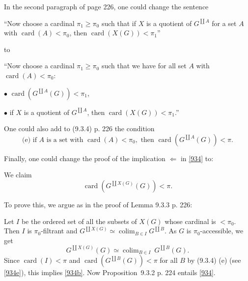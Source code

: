 \documentclass[12pt]{article}
\theoremstyle{remark}
\newcommand{\bu}{\bullet}
\newcommand{\n}{\noindent}
\newcommand{\be}{\begin{equation}}
\newcommand{\ee}{\end{equation}}
\DeclareMathOperator*{\co}{colim}
\DeclareMathOperator{\ca}{card}
\begin{document}
In the second paragraph of page 226, one could change the sentence 

``Now choose a cardinal $\pi_1\ge\pi_0$ such that if $X$ is a quotient of $G^{\coprod A}$ for a set $A$ with $\ca(A)<\pi_0$, then $\ca(X(G))<\pi_1$''

\n to 

``Now choose a cardinal $\pi_1\ge\pi_0$ such that we have for all set $A$ with $\ca(A)<\pi_0$: 

$\bu$ $\ca(G^{\coprod A}(G))<\pi_1$, 

$\bu$ if $X$ is a quotient of $G^{\coprod A}$, then $\ca(X(G))<\pi_1$.'' 

One could also add to (9.3.4) p. 226 the condition 
\be\label{934e}
\text{(e) if }A\text{ is a set with }\ca(A)<\pi_0,\text{ then }\ca(G^{\coprod A}(G))<\pi.
\ee

Finally, one could change the proof of the implication $\Leftarrow$ in \eqref{934} to: 

We claim  
\be\label{934b}
\ca(G^{\coprod X(G)}(G))<\pi.
\ee 

To prove this, we argue as in the proof of Lemma 9.3.3 p. 226: 

Let $I$ be the ordered set of all the subsets of $X(G)$ whose cardinal is $<\pi_0$. Then $I$ is $\pi_0$-filtrant and $G^{\coprod X(G)}\simeq\co_{B\in I}G^{\coprod B}$. As $G$ is $\pi_0$-accessible, we get 
$$
G^{\coprod X(G)}(G)\simeq\co_{B\in I}\ G^{\coprod B}(G).
$$ 
Since $\ca(I)<\pi$ and $\ca(G^{\coprod B}(G))<\pi$ for all $B$ by (9.3.4) (e) (see \eqref{934e}), this implies \eqref{934b}. Now Proposition~9.3.2 p. 224 entails \eqref{934}. 
% 
\end{document}
